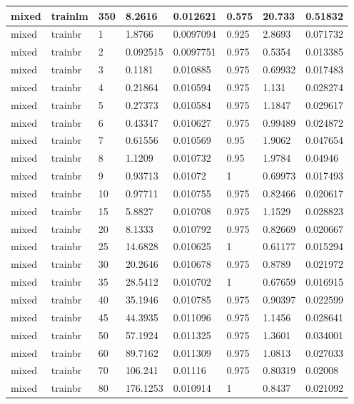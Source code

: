\begin{longtable}{llllllll}
mixed & trainlm & 350 & 8.2616 & 0.012621 & 0.575 & 20.733 & 0.51832 \\ \hline 
mixed & trainbr & 1 & 1.8766 & 0.0097094 & 0.925 & 2.8693 & 0.071732 \\ \hline 
mixed & trainbr & 2 & 0.092515 & 0.0097751 & 0.975 & 0.5354 & 0.013385 \\ \hline 
mixed & trainbr & 3 & 0.1181 & 0.010885 & 0.975 & 0.69932 & 0.017483 \\ \hline 
mixed & trainbr & 4 & 0.21864 & 0.010594 & 0.975 & 1.131 & 0.028274 \\ \hline 
mixed & trainbr & 5 & 0.27373 & 0.010584 & 0.975 & 1.1847 & 0.029617 \\ \hline 
mixed & trainbr & 6 & 0.43347 & 0.010627 & 0.975 & 0.99489 & 0.024872 \\ \hline 
mixed & trainbr & 7 & 0.61556 & 0.010569 & 0.95 & 1.9062 & 0.047654 \\ \hline 
mixed & trainbr & 8 & 1.1209 & 0.010732 & 0.95 & 1.9784 & 0.04946 \\ \hline 
mixed & trainbr & 9 & 0.93713 & 0.01072 & 1 & 0.69973 & 0.017493 \\ \hline 
mixed & trainbr & 10 & 0.97711 & 0.010755 & 0.975 & 0.82466 & 0.020617 \\ \hline 
mixed & trainbr & 15 & 5.8827 & 0.010708 & 0.975 & 1.1529 & 0.028823 \\ \hline 
mixed & trainbr & 20 & 8.1333 & 0.010792 & 0.975 & 0.82669 & 0.020667 \\ \hline 
mixed & trainbr & 25 & 14.6828 & 0.010625 & 1 & 0.61177 & 0.015294 \\ \hline 
mixed & trainbr & 30 & 20.2646 & 0.010678 & 0.975 & 0.8789 & 0.021972 \\ \hline 
mixed & trainbr & 35 & 28.5412 & 0.010702 & 1 & 0.67659 & 0.016915 \\ \hline 
mixed & trainbr & 40 & 35.1946 & 0.010785 & 0.975 & 0.90397 & 0.022599 \\ \hline 
mixed & trainbr & 45 & 44.3935 & 0.011096 & 0.975 & 1.1456 & 0.028641 \\ \hline 
mixed & trainbr & 50 & 57.1924 & 0.011325 & 0.975 & 1.3601 & 0.034001 \\ \hline 
mixed & trainbr & 60 & 89.7162 & 0.011309 & 0.975 & 1.0813 & 0.027033 \\ \hline 
mixed & trainbr & 70 & 106.241 & 0.01116 & 0.975 & 0.80319 & 0.02008 \\ \hline 
mixed & trainbr & 80 & 176.1253 & 0.010914 & 1 & 0.8437 & 0.021092 \\ \hline 

\end{longtable}

